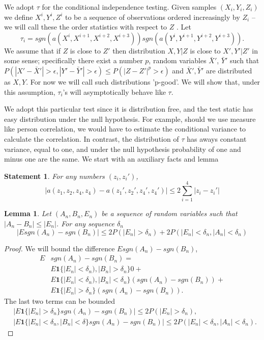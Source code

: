 \documentclass{article}
\newtheorem{lemma}{Lemma}
\newtheorem{statement}{Statement}
\begin{document}
We adopt $\tau$ for the conditional independence testing. Given samples $(X_i,Y_i,Z_i)$ we define  $X^{i},Y^{i},Z^{i}$ to be a sequence of observations ordered increasingly by $Z_i$ -- we will call these the order statistics with respect to $Z$ . Let
 \[ 
\tau_i = sgn(a(X^{i},X^{i+1},X^{i+2},X^{i+3})) sgn(a(Y^{i},Y^{i+1},Y^{i+2},Y^{i+3})).  
 \]
We assume that if $Z$ is close to $Z'$ then  distribution $X,Y|Z$ is close to  $X',Y'|Z'$ in some sense; specifically  there exist a number $p$,  random variables  $\bar X'$, $\bar Y'$ such that $P( |X'- \bar X'|>\epsilon,|Y'- \bar Y'|>\epsilon  ) \leq P(|Z-Z'|^p>\epsilon)$ and $\bar X', \bar Y'$ are distributed as $X,Y$. For now we will call such distributions 'p-good'. We will show that, under this assumption, $\tau_i$'s will asymptotically behave like $\tau$.   

We adopt this particular test since it is distribution free, and the test static has easy distribution under the null hypothesis. For example, should we use measure like person correlation, we would have to estimate the conditional variance to calculate the correlation. In contrast, the distribution of $\tau$ has aways constant variance, equal to one, and under the null hypothesis probability of one and minus one are the same.  We start with an auxiliary facts and lemma
\begin{statement}
\label{lem:err}
For any numbers $(z_i,z_i')$, 
\[
| a(z_1,z_2,z_4,z_4) -  a(z_1',z_2',z_4',z_4')| \leq 2\sum_{i=1}^4 |z_i-z_i'|
\]
\end{statement}


\begin{lemma}
\label{lem:bnd}
Let $(A_n,B_n,E_n)$ be a sequence of random variables such that  $|A_n-B_n| \leq |E_n|$. For any sequence $\delta_n$
\[
\left | E  sgn(A_n) - sgn(B_n) \right | \leq  2P(|E_n|>\delta_n) + 2 P(|E_n| < \delta_n ,|A_n| < \delta_n)
\]
\end{lemma} 
\begin{proof}
We will bound the difference $E sgn(A_n) - sgn(B_n)$,
\begin{align}
E&  sgn(A_n) - sgn(B_n)= \\
&E \mathbf  1 \{ |E_n| < \delta_n ) , |B_n| > \delta_n \} 0 +\\
&E \mathbf 1 \{ |E_n| < \delta_n)  , |B_n| < \delta_n\}  (sgn(A_n) - sgn(B_n)) + \\
&E \mathbf 1 \{ |E_n| > \delta_n  \}  (sgn(A_n) - sgn(B_n)).  
 \end{align}
The last two terms can be bounded
 \begin{align}
&   |E\mathbf 1 \{ |E_n| > \delta_n   \}  sgn(A_n) - sgn(B_n)| \leq 2 P( |E_n|>\delta_n) , \\
&   |E \mathbf 1 \{ |E_n| < \delta_n   , |B_n| < \delta  \}  sgn(A_n) - sgn(B_n) | \leq 2 P(|E_n| < \delta_n ,|A_n| < \delta_n) . 
\end{align}
\end{proof}
\end{document}
